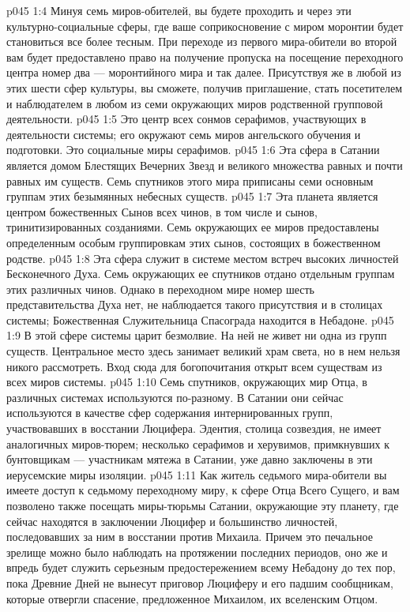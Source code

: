 \vs p045 1:4 Минуя семь миров\hyp{}обителей, вы будете проходить и через эти культурно\hyp{}социальные сферы, где ваше соприкосновение с миром моронтии будет становиться все более тесным. При переходе из первого мира\hyp{}обители во второй вам будет предоставлено право на получение пропуска на посещение переходного центра номер два --- моронтийного мира и так далее. Присутствуя же в любой из этих шести сфер культуры, вы сможете, получив приглашение, стать посетителем и наблюдателем в любом из семи окружающих миров родственной групповой деятельности.
\vs p045 1:5 \pc {} Это центр всех сонмов серафимов, участвующих в деятельности системы; его окружают семь миров ангельского обучения и подготовки. Это социальные миры серафимов.
\vs p045 1:6 \pc {} Эта сфера в Сатании является домом Блестящих Вечерних Звезд и великого множества равных и почти равных им существ. Семь спутников этого мира приписаны семи основным группам этих безымянных небесных существ.
\vs p045 1:7 \pc {} Эта планета является центром божественных Сынов всех чинов, в том числе и сынов, тринитизированных созданиями. Семь окружающих ее миров предоставлены определенным особым группировкам этих сынов, состоящих в божественном родстве.
\vs p045 1:8 \pc {} Эта сфера служит в системе местом встреч высоких личностей Бесконечного Духа. Семь окружающих ее спутников отдано отдельным группам этих различных чинов. Однако в переходном мире номер шесть представительства Духа нет, не наблюдается такого присутствия и в столицах системы; Божественная Служительница Спасограда находится  в Небадоне.
\vs p045 1:9 \pc {} В этой сфере системы царит безмолвие. На ней не живет ни одна из групп существ. Центральное место здесь занимает великий храм света, но в нем нельзя никого рассмотреть. Вход сюда для богопочитания открыт всем существам из всех миров системы.
\vs p045 1:10 Семь спутников, окружающих мир Отца, в различных системах используются по\hyp{}разному. В Сатании они сейчас используются в качестве сфер содержания интернированных групп, участвовавших в восстании Люцифера. Эдентия, столица созвездия, не имеет аналогичных миров\hyp{}тюрем; несколько серафимов и херувимов, примкнувших к бунтовщикам --- участникам мятежа в Сатании, уже давно заключены в эти иерусемские миры изоляции.
\vs p045 1:11 Как житель седьмого мира\hyp{}обители вы имеете доступ к седьмому переходному миру, к сфере Отца Всего Сущего, и вам позволено также посещать миры\hyp{}тюрьмы Сатании, окружающие эту планету, где сейчас находятся в заключении Люцифер и большинство личностей, последовавших за ним в восстании против Михаила. Причем это печальное зрелище можно было наблюдать на протяжении последних периодов, оно же и впредь будет служить серьезным предостережением всему Небадону до тех пор, пока Древние Дней не вынесут приговор Люциферу и его падшим сообщникам, которые отвергли спасение, предложенное Михаилом, их вселенским Отцом.
